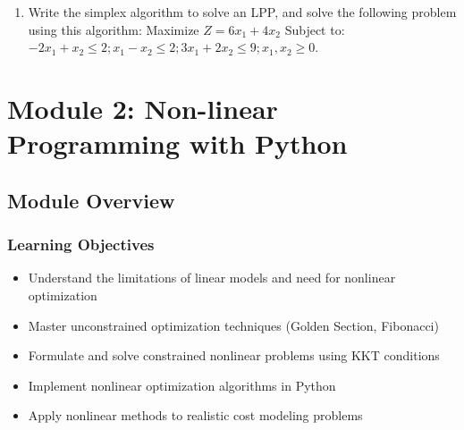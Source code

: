 \documentclass[
  letterpaper,
  DIV=11,
  numbers=noendperiod]{scrreprt}
\providecommand{\tightlist}{%
  \setlength{\itemsep}{0pt}\setlength{\parskip}{0pt}}
\begin{document}
\begin{enumerate}
  A company produces two articles, A and B. There are two different
  departments through which the articles are processed, viz, the
  assembly line and the finishing phase. The assembly department's
  capacity is 60 hours per week, and the finishing department's is 48
  hours per week. Producing one unit of A requires 4 hours of assembly
  and 2 hours of finishing. Each unit B requires 2 hours in assembly and
  4 hours in finishing. If the profit is Rs. 8 per unit of A and Rs. 6
  per unit of B, formulate this problem as an LPP and determine the
  number of units of A and B to be produced each week to maximize
  profit.
\item
  Write the simplex algorithm to solve an LPP, and solve the following
  problem using this algorithm: Maximize \(Z=6x_1+4x_2\) Subject to:
  \(-2x_1+x_2\le 2;        x_1-x_2\le 2;  3x_1+2x_2\le 9;  x_1,x_2\ge 0.\)
\end{enumerate}


\chapter{Module 2: Non-linear Programming with
Python}\label{module-2-non-linear-programming-with-python}

\section{Module Overview}\label{module-overview-1}

\subsection{Learning Objectives}\label{learning-objectives-2}

\begin{itemize}
\tightlist
\item
  Understand the limitations of linear models and need for nonlinear
  optimization
\item
  Master unconstrained optimization techniques (Golden Section,
  Fibonacci)
\item
  Formulate and solve constrained nonlinear problems using KKT
  conditions
\item
  Implement nonlinear optimization algorithms in Python
\item
  Apply nonlinear methods to realistic cost modeling problems
\end{itemize}
\end{document}
